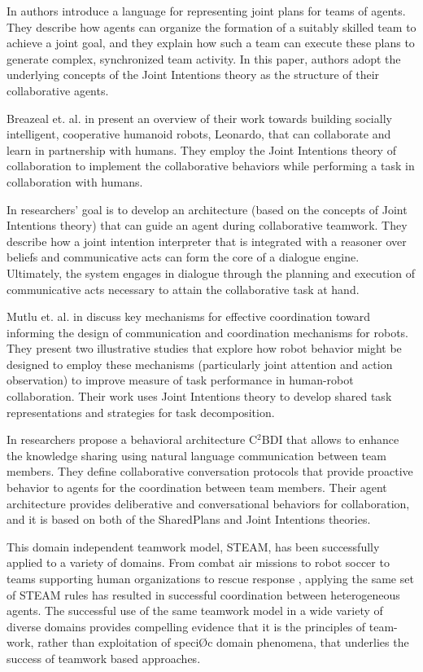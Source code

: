 \documentclass[11pt]{article}
\begin{document}
In \cite{kinny:planned-team} authors introduce a language for representing joint
plans for teams of agents. They describe how agents can organize the formation
of a suitably skilled team to achieve a joint goal, and they explain how such a
team can execute these plans to generate complex, synchronized team activity. In
this paper, authors adopt the underlying concepts of the Joint Intentions theory
as the structure of their collaborative agents.

Breazeal et. al. in \cite{breazeal:humanoid-robots} present an overview of their
work towards building socially intelligent, cooperative humanoid robots,
Leonardo, that can collaborate and learn in partnership with humans. They employ
the Joint Intentions theory of collaboration to implement the collaborative
behaviors while performing a task in collaboration with humans.

In \cite{subramanian:joint-intention-dialogue} researchers' goal is to develop
an architecture (based on the concepts of Joint Intentions theory) that can
guide an agent during collaborative teamwork. They describe how a joint
intention interpreter that is integrated with a reasoner over beliefs and
communicative acts can form the core of a dialogue engine. Ultimately, the
system engages in dialogue through the planning and execution of communicative
acts necessary to attain the collaborative task at hand.

Mutlu et. al. in \cite{mutlu:coordination-robot} discuss key mechanisms for
effective coordination toward informing the design of communication and
coordination mechanisms for robots. They present two illustrative studies that
explore how robot behavior might be designed to employ these mechanisms
(particularly joint attention and action observation) to improve measure of task
performance in human-robot collaboration. Their work uses Joint Intentions
theory to develop shared task representations and strategies for task
decomposition.

In \cite{kabil:coordination-mechanisms} researchers propose a behavioral
architecture C$^2$BDI that allows to enhance the knowledge sharing using natural
language communication between team members. They define collaborative
conversation protocols that provide proactive behavior to agents for the
coordination between team members. Their agent architecture provides
deliberative and conversational behaviors for collaboration, and it is based
on both of the SharedPlans and Joint Intentions theories.

This domain independent teamwork model, STEAM, has been successfully applied to
a variety of domains.  From combat air missions
\cite{hill:synthetic-battlefield-aircraft} to robot soccer \cite{kitano:robocup}
to teams supporting human organizations
\cite{pynadath:teamwork-heterogeneous-agents} to rescue response
\cite{scerri:robot-agent-person}, applying the same set of STEAM rules has
resulted in successful coordination between heterogeneous agents. The successful
use of the same teamwork model in a wide variety of diverse domains provides
compelling evidence that it is the principles of team- work, rather than
exploitation of speciØc domain phenomena, that underlies the success of teamwork
based approaches.
\end{document}
